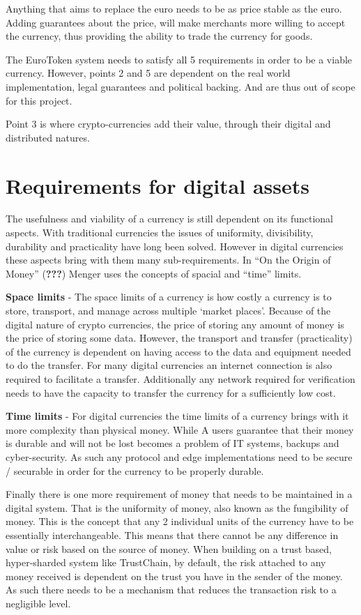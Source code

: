 \documentclass[whitelogo]{tudelft-report}
\begin{document}
Anything that aims to replace the euro needs to be as price stable as
the euro. Adding guarantees about the price, will make merchants more
willing to accept the currency, thus providing the ability to trade the
currency for goods.

The EuroToken system needs to satisfy all 5 requirements in order to be
a viable currency. However, points 2 and 5 are dependent on the real
world implementation, legal guarantees and political backing. And are
thus out of scope for this project.

Point 3 is where crypto-currencies add their value, through their
digital and distributed natures.

\section{Requirements for digital
assets}\label{requirements-for-digital-assets}

The usefulness and viability of a currency is still dependent on its
functional aspects. With traditional currencies the issues of
uniformity, divisibility, durability and practicality have long been
solved. However in digital currencies these aspects bring with them many
sub-requirements. In ``On the Origin of Money'' ({\textbf{???}}) Menger
uses the concepts of spacial and ``time'' limits.

\textbf{Space limits} - The space limits of a currency is how costly a
currency is to store, transport, and manage across multiple `market
places'. Because of the digital nature of crypto currencies, the price
of storing any amount of money is the price of storing some data.
However, the transport and transfer (practicality) of the currency is
dependent on having access to the data and equipment needed to do the
transfer. For many digital currencies an internet connection is also
required to facilitate a transfer. Additionally any network required for
verification needs to have the capacity to transfer the currency for a
sufficiently low cost.

\textbf{Time limits} - For digital currencies the time limits of a
currency brings with it more complexity than physical money. While A
users guarantee that their money is durable and will not be lost becomes
a problem of IT systems, backups and cyber-security. As such any
protocol and edge implementations need to be secure / securable in order
for the currency to be properly durable.

Finally there is one more requirement of money that needs to be
maintained in a digital system. That is the uniformity of money, also
known as the fungibility of money. This is the concept that any 2
individual units of the currency have to be essentially interchangeable.
This means that there cannot be any difference in value or risk based on
the source of money. When building on a trust based, hyper-sharded
system like TrustChain, by default, the risk attached to any money
received is dependent on the trust you have in the sender of the money.
As such there needs to be a mechanism that reduces the transaction risk
to a negligible level.
\end{document}
